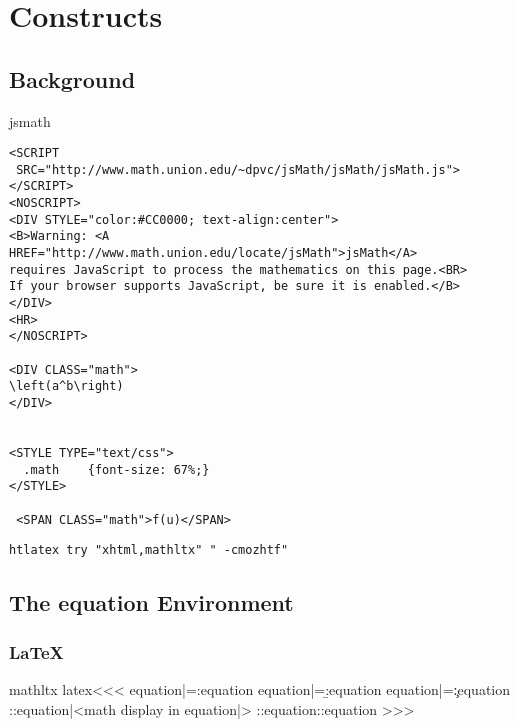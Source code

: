 \chapter{Constructs}


\section{Background}

jsmath\EndLink


\begin{verbatim}
<SCRIPT
 SRC="http://www.math.union.edu/~dpvc/jsMath/jsMath/jsMath.js"></SCRIPT> 
<NOSCRIPT> 
<DIV STYLE="color:#CC0000; text-align:center"> 
<B>Warning: <A HREF="http://www.math.union.edu/locate/jsMath">jsMath</A> 
requires JavaScript to process the mathematics on this page.<BR> 
If your browser supports JavaScript, be sure it is enabled.</B> 
</DIV> 
<HR> 
</NOSCRIPT>
 
<DIV CLASS="math"> 
\left(a^b\right)
</DIV> 


<STYLE TYPE="text/css">
  .math    {font-size: 67%;}
</STYLE>

 <SPAN CLASS="math">f(u)</SPAN> 

\end{verbatim}

\begin{verbatim}
htlatex try "xhtml,mathltx" " -cmozhtf" 
\end{verbatim}

\section{The equation Environment}


\subsection{LaTeX}


\<mathltx latex\><<<
\let\A:equation|=\a:equation
\let\B:equation|=\b:equation
\let\C:equation|=\c:equation
  {\A:equation|<math display in equation|>}
  {\B:equation}{\C:equation}
>>>

